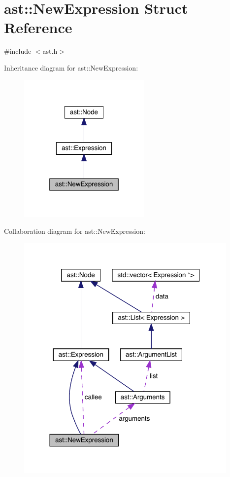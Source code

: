 \hypertarget{structast_1_1_new_expression}{}\section{ast\+:\+:New\+Expression Struct Reference}
\label{structast_1_1_new_expression}


{\ttfamily \#include $<$ast.\+h$>$}



Inheritance diagram for ast\+:\+:New\+Expression\+:\nopagebreak
\begin{figure}[H]
\begin{center}
\leavevmode
\includegraphics[width=184pt]{structast_1_1_new_expression__inherit__graph}
\end{center}
\end{figure}


Collaboration diagram for ast\+:\+:New\+Expression\+:\nopagebreak
\begin{figure}[H]
\begin{center}
\leavevmode
\includegraphics[width=308pt]{structast_1_1_new_expression__coll__graph}
\end{center}
\end{figure}
